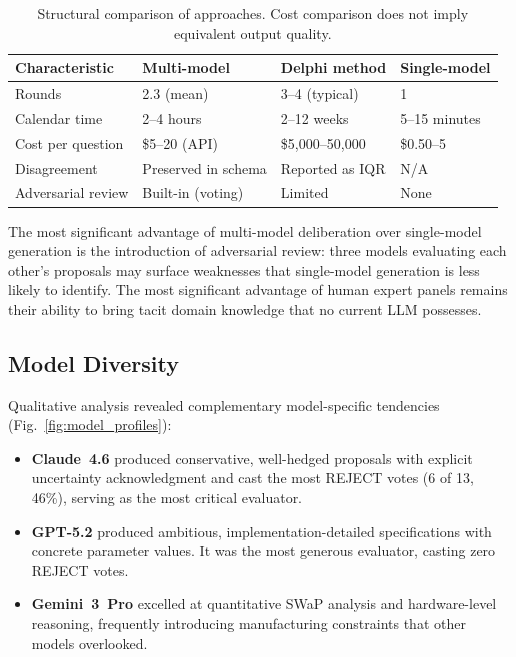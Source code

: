 \documentclass[11pt,a4paper]{article}
\begin{document}
\begin{table}[ht]
\centering
\caption{Structural comparison of approaches. Cost comparison does not imply equivalent output quality.}
\label{tab:comparison}
\begin{tabular}{@{}p{2.5cm}p{3.5cm}p{3.5cm}p{3cm}@{}}
\toprule
\textbf{Characteristic} & \textbf{Multi-model} & \textbf{Delphi method} & \textbf{Single-model} \\
\midrule
Rounds & 2.3 (mean) & 3--4 (typical) & 1 \\
Calendar time & 2--4 hours & 2--12 weeks & 5--15 minutes \\
Cost per question & \$5--20 (API) & \$5{,}000--50{,}000 & \$0.50--5 \\
Disagreement & Preserved in schema & Reported as IQR & N/A \\
Adversarial review & Built-in (voting) & Limited & None \\
\bottomrule
\end{tabular}
\end{table}

The most significant advantage of multi-model deliberation over single-model generation is the introduction of adversarial review: three models evaluating each other's proposals may surface weaknesses that single-model generation is less likely to identify. The most significant advantage of human expert panels remains their ability to bring tacit domain knowledge that no current LLM possesses.

\subsection{Model Diversity}

Qualitative analysis revealed complementary model-specific tendencies (Fig.~\ref{fig:model_profiles}):

\begin{itemize}[nosep]
    \item \textbf{Claude~4.6} produced conservative, well-hedged proposals with explicit uncertainty acknowledgment and cast the most REJECT votes (6 of 13, 46\%), serving as the most critical evaluator.
    \item \textbf{GPT-5.2} produced ambitious, implementation-detailed specifications with concrete parameter values. It was the most generous evaluator, casting zero REJECT votes.
    \item \textbf{Gemini~3~Pro} excelled at quantitative SWaP analysis and hardware-level reasoning, frequently introducing manufacturing constraints that other models overlooked.
\end{itemize}
\end{document}
